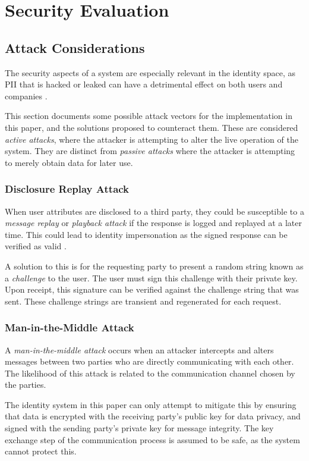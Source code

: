 \chapter{Security Evaluation}
\section{Attack Considerations}
The security aspects of a system are especially relevant in the identity space, as \ac{PII} that is hacked or leaked can have a detrimental effect on both users and companies \cite{acquisti_is_2006}. 

This section documents some possible attack vectors for the implementation in this paper, and the solutions proposed to counteract them. These are considered \textit{active attacks}, where the attacker is attempting to alter the live operation of the system. They are distinct from \textit{passive attacks} where the attacker is attempting to merely obtain data for later use.

\subsection{Disclosure Replay Attack}
When user attributes are disclosed to a third party, they could be susceptible to a \textit{message replay} or \textit{playback attack} if the response is logged and replayed at a later time. This could lead to identity impersonation as the signed response can be verified as valid \cite{noauthor_replay_nodate}.

A solution to this is for the requesting party to present a random string known as a \textit{challenge} to the user. The user must sign this challenge with their private key. Upon receipt, this signature can be verified against the challenge string that was sent. These challenge strings are transient and regenerated for each request. 

\subsection{Man-in-the-Middle Attack}
A \textit{man-in-the-middle attack} occurs when an attacker intercepts and alters messages between two parties who are directly communicating with each other. The likelihood of this attack is related to the communication channel chosen by the parties.

The identity system in this paper can only attempt to mitigate this by ensuring that data is encrypted with the receiving party's public key for data privacy, and signed with the sending party's private key for message integrity. The key exchange step of the communication process is assumed to be safe, as the system cannot protect this.


